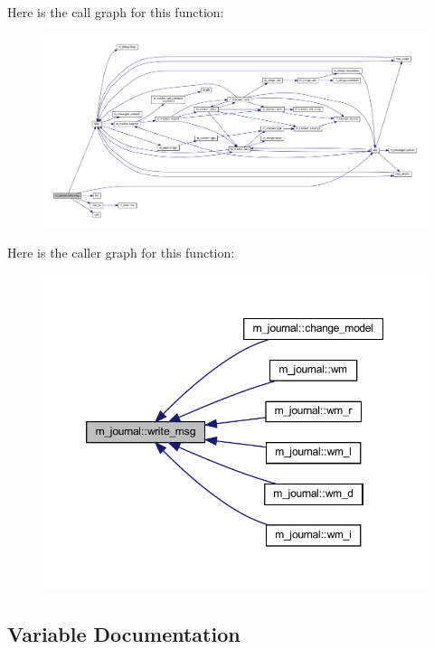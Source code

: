 Here is the call graph for this function\+:
\nopagebreak
\begin{figure}[H]
\begin{center}
\leavevmode
\includegraphics[width=350pt]{namespacem__journal_a98698c251ec1883612ae40c5f2443fd9_cgraph}
\end{center}
\end{figure}
Here is the caller graph for this function\+:
\nopagebreak
\begin{figure}[H]
\begin{center}
\leavevmode
\includegraphics[width=350pt]{namespacem__journal_a98698c251ec1883612ae40c5f2443fd9_icgraph}
\end{center}
\end{figure}


\subsection{Variable Documentation}
\mbox{\label{namespacem__journal_a6184fbcebdfa06f0a45ce4c699189b53}} 
